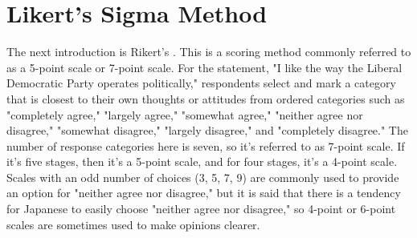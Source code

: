 \documentclass{ltjsbook}
\begin{document}
\section{Likert's Sigma Method}
\label{LikertScale}
The next introduction is Rikert's . This is a scoring method commonly referred to as a 5-point scale or 7-point scale. For the statement, "I like the way the Liberal Democratic Party operates politically," respondents select and mark a category that is closest to their own thoughts or attitudes from ordered categories such as "completely agree," "largely agree," "somewhat agree," "neither agree nor disagree," "somewhat disagree," "largely disagree," and "completely disagree." The number of response categories here is seven, so it's referred to as 7-point scale. If it's five stages, then it's a 5-point scale, and for four stages, it's a 4-point scale. Scales with an odd number of choices (3, 5, 7, 9) are commonly used to provide an option for "neither agree nor disagree," but it is said that there is a tendency for Japanese to easily choose "neither agree nor disagree," so 4-point or 6-point scales are sometimes used to make opinions clearer.
\end{document}
